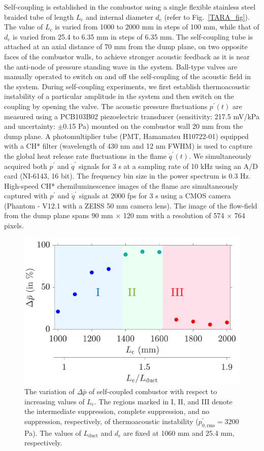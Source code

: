 \documentclass[twocolumn,10pt]{article} %
\begin{document}
Self-coupling is established in the combustor using a single flexible stainless steel braided tube of length $L_{\text{c}}$ and internal diameter $d_{\text{c}}$ (refer to Fig.~\ref{TARA_fig}). The value of  $L_{\text{c}}$ is varied from 1000 to 2000 mm in steps of 100 mm, while that of $d_{\text{c}}$ is varied from 25.4 to 6.35 mm in steps of 6.35 mm. The self-coupling tube is attached at an axial distance of 70 mm from the dump plane, on two opposite faces of the combustor walls, to achieve stronger acoustic feedback as it is near the anti-node of pressure standing wave in the system. Ball-type valves are manually operated to switch on and off the self-coupling of the acoustic field in the system. During self-coupling experiments, we first establish thermoacoustic instability of a particular amplitude in the system and then switch on the coupling by opening the valve. 
The acoustic pressure fluctuations $p^{\prime}(t)$ are measured using a PCB103B02 piezoelectric transducer (sensitivity: 217.5 mV/kPa and uncertainty: $\pm$0.15 Pa) mounted on the combustor wall 20 mm from the dump plane. A photomultiplier tube (PMT, Hamamatsu H10722-01) equipped with a CH* filter (wavelength of 430 nm and 12 nm FWHM) is used to capture the global heat release rate fluctuations in the flame $\dot{q}^{\prime}(t)$. We simultaneously acquired both $p^{\prime}$  and $\dot{q}^{\prime}$  signals for 3 s at a sampling rate of 10 kHz using an A/D card (NI-6143, 16 bit). The frequency bin size in the power spectrum is 0.3 Hz.  High-speed CH* chemiluminescence images of the flame are simultaneously captured with $p^{\prime}$  and $\dot{q}^{\prime}$ signals at 2000 fps for 3 s using a CMOS camera (Phantom - V12.1 with a ZEISS 50 mm camera lens). The image of the flow-field from the dump plane spans 90 mm $\times$ 120 mm with a resolution of 574 $\times$ 764 pixels.

\begin{figure}[b!]
\centering
\includegraphics[width=.45\textwidth]{fig2.png}
\caption{The variation of $\Delta \bar{p}$ of self-coupled combustor with respect to increasing values of $L_{\text{c}}$. The regions marked in I, II, and III denote the intermediate suppression, complete suppression, and no suppression, respectively, of thermoacoustic instability ($p^\prime_{0,\text{rms}}=3200$ Pa). The values of $L_{\text{duct}}$ and $d_{\text{c}}$ are fixed at 1060 mm and 25.4 mm, respectively. }
\label{fig2}
\end{figure}
\end{document}

